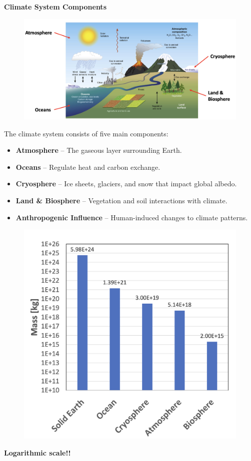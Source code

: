 \documentclass[fontsize=8pt, a4paper, landscape, fleqn]{scrartcl}
\renewcommand{\subsection}[1]{%
    \noindent\colorbox{subsectioncolor}{%
        \parbox{\dimexpr\columnwidth-2\fboxsep}{\color{white}\textbf{#1}}}%
    \vspace{0.5mm}%
}
\begin{document}
\begin{multicols*}{3}[\raggedcolumns]
\subsection{Climate System Components}
\begin{figure}[H]
    \centering
    \includegraphics[width=1\linewidth]{CS//img/Components_Climate_System.png}
\end{figure}
The climate system consists of five main components:
\begin{itemize}
    \item \textbf{Atmosphere} – The gaseous layer surrounding Earth.
    \item \textbf{Oceans} – Regulate heat and carbon exchange.
    \item \textbf{Cryosphere} – Ice sheets, glaciers, and snow that impact global albedo.
    \item \textbf{Land \& Biosphere} – Vegetation and soil interactions with climate.
    \item \textbf{Anthropogenic Influence} – Human-induced changes to climate patterns.
\end{itemize}

\begin{figure}[H]
    \centering
    \includegraphics[width=0.8\linewidth]{CS//img/Abs_mass_components.png}
\end{figure}
\textbf{Logarithmic scale!!}\\

\end{multicols*}
\end{document}
